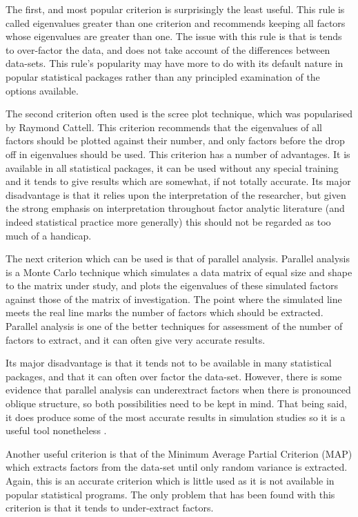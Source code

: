 The first, and most popular criterion is surprisingly the least useful\cite{zwick1986comparison}. This rule is called eigenvalues greater than one criterion and recommends keeping all factors whose eigenvalues are greater than one. The issue with this rule is that is tends to over-factor the data, and does not take account of the differences between data-sets. This rule's popularity may have more to do with its default nature in popular statistical packages rather than any principled examination of the options available. 

The second criterion often used is the scree plot technique, which was popularised by Raymond Cattell. This criterion recommends that the eigenvalues of all factors should be plotted against their number, and only factors before the drop off in eigenvalues should be used. This criterion has a number of advantages. It is available in all statistical packages, it can be used without any special training and it tends to give results which are somewhat, if not totally accurate. Its major disadvantage is that it relies upon the interpretation of the researcher, but given the strong emphasis on interpretation throughout factor analytic literature (and indeed statistical practice more generally) this should not be regarded as too much of a handicap. 

The next criterion which can be used is that of parallel analysis. Parallel analysis is a Monte Carlo technique which simulates a data matrix of equal size and shape to the matrix under study, and plots the eigenvalues of these simulated factors against those of the matrix of investigation. The point where the simulated line meets the real line marks the number of factors which should be extracted. Parallel analysis is one of the better techniques for assessment of the number of factors to extract, and it can often give very accurate results. 

Its major disadvantage is that it tends not to be available in many statistical packages, and that it can often over factor the data-set. However, there is some evidence \cite{beauducel2001problems} that parallel analysis can underextract factors when there is pronounced oblique structure, so both possibilities need to be kept in mind. That being said, it does produce some of the most accurate results in simulation studies so it is a useful tool nonetheless \cite{zwick1986comparison}.

Another useful criterion is that of the Minimum Average Partial Criterion (MAP) which extracts factors from the data-set until only random variance is extracted. Again, this is an accurate criterion  \cite{zwick1986comparison} which is little used as it is not available in popular statistical programs. The only problem that  has been found with this criterion is that it tends to under-extract factors. %

